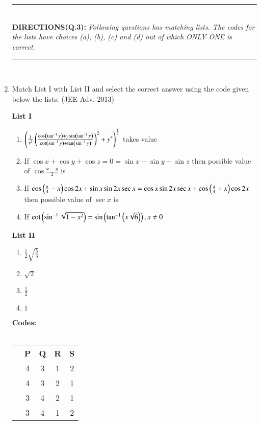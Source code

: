 \documentclass[journal,12pt,twocolumn]{IEEEtran}
\theoremstyle{remark}
\begin{document}
\begin{enumerate}
	\hrule
		\text{}\\
		\textbf{DIRECTIONS(Q.3): }\textit{Following questions has matching lists. The codes for the lists have choices (a), (b), (c) and (d) out of which ONLY ONE is correct.}\\
	\hrule
	\text{}\\

	\item{	
		Match List I with List II and select the correct answer using the code given below the lists: \hfill (JEE Adv. 2013)
		\begin{multicols}{2}
			\textbf{List I}\\
			\begin{enumerate}
				\item{$\left(\frac{1}{y^2}\left(\frac{\cos\left(\tan^{-1}y\right)+y\sin\left(\tan^{-1}y\right)}{\cot\left(\sin^{-1}y\right)+\tan\left(\sin^{-1}y\right)}\right)^2 + y^4\right)^\frac{1}{2}$} takes value
				\item{If $\cos x+\cos y+\cos z = 0 = \sin x+\sin y+\sin z$ then possible value of $\cos\frac{x-y}{2}$ is}
				\item{If $\cos\left(\frac{\pi}{4}-x\right) \cos 2x+\sin x\sin 2x\sec x=\cos x\sin 2x\sec x+\cos\left(\frac{\pi}{4}+x\right)\cos 2x$ then possible value of $\sec x$ is}
				\item{If $\cot\left(\sin^{-1}\sqrt{1-x^2}\right)=\sin\left(\tan^{-1}\left(x\sqrt{6}\right)\right),x\neq 0$}
			\end{enumerate}
			\columnbreak
			\textbf{List II}\\
			\begin{enumerate}
				\item{$\frac{1}{2}\sqrt{\frac{5}{3}}$}
				\item{$\sqrt{2}$}
				\item{$\frac{1}{2}$}
				\item{$1$}
			\end{enumerate}
		\end{multicols}
		\textbf{Codes:}\\
		\\
		\begin{tabular}{c c c c c}
			& \textbf{P} & \textbf{Q} & \textbf{R} & \textbf{S} \\
			\brak{a} & 4 & 3 & 1 & 2 \\
			\brak{b} & 4 & 3 & 2 & 1 \\
			\brak{c} & 3 & 4 & 2 & 1 \\
			\brak{d} & 3 & 4 & 1 & 2 \\
		\end{tabular}
		}
\end{enumerate}
\end{document}
